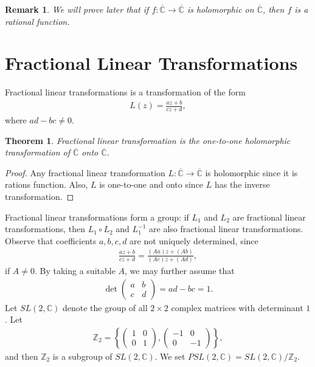 \documentclass[11pt]{book}
\newtheorem{theorem}{Theorem}[chapter]
\newtheorem{remark}{Remark}[chapter]
\theoremstyle{definition}
\numberwithin{equation}{chapter}
\begin{document}
\begin{remark}
We will prove later that if $f: \overline{\mathbb{C}} \to \overline{\mathbb{C}}$ is holomorphic on $\overline{\mathbb{C}}$, then $f$ is a rational function.
\end{remark}

\medskip

\section{Fractional Linear Transformations}

Fractional linear transformations is a transformation of the form
\begin{align*}
    L(z) = \frac{az + b}{cz + d},
\end{align*}
where $ad - bc \neq 0$. 

\medskip

\begin{theorem}
Fractional linear transformation is the one-to-one holomorphic transformation of $\overline{\mathbb{C}}$ onto $\overline{\mathbb{C}}$.
\end{theorem}
\begin{proof}
Any fractional linear transformation $L: \overline{\mathbb{C}} \to \overline{\mathbb{C}}$ is holomorphic since it is rations function. Also, $L$ is one-to-one and onto since $L$ has the inverse transformation.
\end{proof}

\medskip

Fractional linear transformations form a group: if $L_1$ and $L_2$ are fractional linear transformations, then $L_1 \circ L_2$ and $L_1^{-1}$ are also fractional linear transformations. Observe that coefficients $a,b,c,d$ are not uniquely determined, since 
\begin{align*}
    \frac{az + b}{cz + d} = \frac{(Aa)z + (Ab)}{(Ac)z + (Ad)},
\end{align*}
if $A \neq 0$. By taking a suitable $A$, we may further assume that
\begin{align*}
    \det \begin{pmatrix}
        a & b \\
        c & d
    \end{pmatrix} = ad - bc = 1.
\end{align*}
Let $SL(2, \mathbb{C})$ denote the group of all $2 \times 2$ complex matrices with determinant $1$. Let
\begin{align*}
    \mathbb{Z}_2 = \left\{\begin{pmatrix} 1 & 0 \\ 0 & 1 \end{pmatrix}, \begin{pmatrix} -1 & 0 \\ 0 & -1 \end{pmatrix}\right\},
\end{align*}
and then $\mathbb{Z}_2$ is a subgroup of $SL(2, \mathbb{C})$. We set $PSL(2, \mathbb{C}) = SL(2, \mathbb{C})/\mathbb{Z}_2$.
\end{document}
